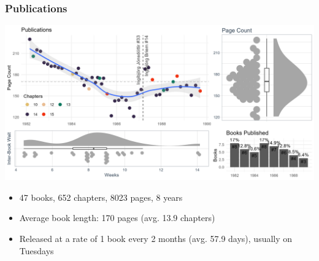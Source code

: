 \begin{frame}
    \frametitle{Publications}
    \includegraphics[width=\textwidth]{../R/figures/margit_count}
    \vspace{-24pt}
    \begin{itemize}
        \item 47 books, 652 chapters, 8023 pages, 8 years
        \item Average book length: 170 pages (avg. 13.9 chapters)
        \item Released at a rate of 1 book every 2 months (avg. 57.9 days), usually on Tuesdays
    \end{itemize}
\end{frame}
